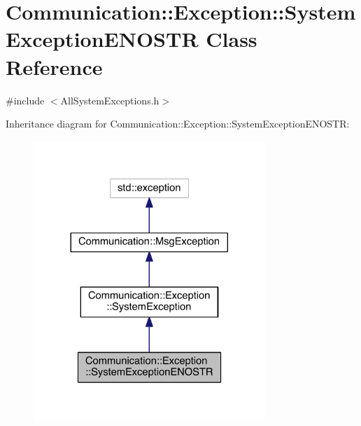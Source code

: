\hypertarget{class_communication_1_1_exception_1_1_system_exception_e_n_o_s_t_r}{}\section{Communication\+:\+:Exception\+:\+:System\+Exception\+E\+N\+O\+S\+T\+R Class Reference}
\label{class_communication_1_1_exception_1_1_system_exception_e_n_o_s_t_r}


{\ttfamily \#include $<$All\+System\+Exceptions.\+h$>$}



Inheritance diagram for Communication\+:\+:Exception\+:\+:System\+Exception\+E\+N\+O\+S\+T\+R\+:\nopagebreak
\begin{figure}[H]
\begin{center}
\leavevmode
\includegraphics[width=248pt]{class_communication_1_1_exception_1_1_system_exception_e_n_o_s_t_r__inherit__graph}
\end{center}
\end{figure}


